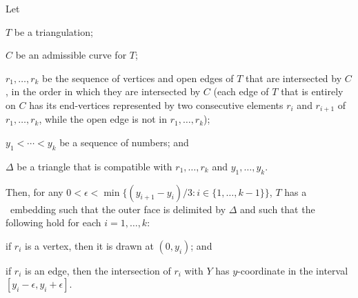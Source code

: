 \begin{thm}
	Let
	\begin{compactenum}
		\item $T$ be a triangulation;
		\item $C$ be an admissible curve for $T$;
		\item $r_1,\ldots,r_k$ be the sequence of vertices and open edges
		of $T$ that are intersected by $C$, in the order in which they are intersected by $C$ (each edge of $T$ that is entirely on $C$ has its end-vertices represented by two consecutive elements $r_i$ and $r_{i+1}$ of $r_1,\ldots,r_k$, while the open edge is not in $r_1,\ldots,r_k$);
		\item $y_1<\cdots<y_k$ be a sequence of numbers; and
		\item $\Delta$ be a triangle that is compatible with 
		$r_1,\ldots,r_k$ and $y_1,\ldots,y_k$.
	\end{compactenum}
	Then, for any $0<\epsilon<\min\{(y_{i+1}-y_i)/3:i\in\{1,\ldots,k-1\}\}$, $T$ has a \Fary\ embedding such that the outer face is delimited by $\Delta$ and such that the following hold for each $i=1,\ldots,k$: 
	\begin{compactenum}
		\item if $r_i$ is a vertex, then it is drawn at $(0,y_i)$; and
		\item if $r_i$ is an edge, then the intersection of $r_i$ with $Y$ has $y$-coordinate in the interval $[y_i-\epsilon,y_i+\epsilon]$.
	\end{compactenum}
\end{thm}

